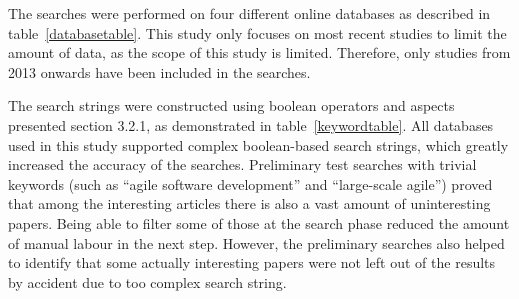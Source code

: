 The searches were performed on four different online databases as
described in table~\ref{databasetable}. This study only focuses on most recent studies to limit
the amount of data, as the scope of this study is limited. Therefore, only
studies from 2013 onwards have been included in the searches.

\bigskip

\bigskip

The search strings were constructed using boolean operators and aspects
presented section 3.2.1, as demonstrated in table~\ref{keywordtable}\@. All databases
used in this study supported complex boolean-based search strings,
which greatly increased the accuracy of the searches. Preliminary test
searches with trivial keywords (such as ``agile software development'' and
``large-scale agile'') proved that among the interesting articles there is
also a vast amount of uninteresting papers. Being able to filter some
of those at the search phase reduced the amount of manual labour in the
next step. However, the preliminary searches also helped to identify
that some actually interesting papers were not left out of the results
by accident due to too complex search string.

\bigskip
{
}
\medskip
